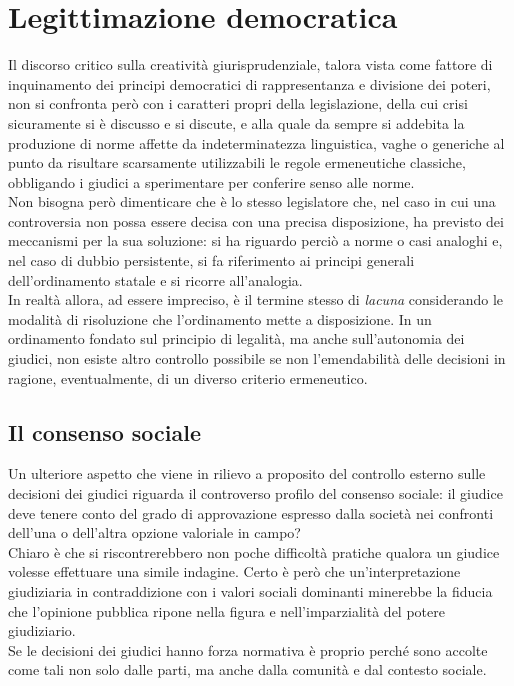 \section{Legittimazione democratica} 
Il discorso critico sulla creatività giurisprudenziale, talora vista come fattore di inquinamento dei principi democratici di rappresentanza e divisione dei poteri, non si confronta però con i caratteri propri della legislazione, della cui crisi sicuramente si è discusso e si discute, e alla quale da sempre si addebita la produzione di norme affette da indeterminatezza linguistica, vaghe o generiche al punto da risultare scarsamente utilizzabili le regole ermeneutiche classiche, obbligando i giudici a sperimentare per conferire senso alle norme.
\\ Non bisogna però dimenticare che è lo stesso legislatore che, nel caso in cui una controversia non possa essere decisa con una precisa disposizione, ha previsto dei meccanismi per la sua soluzione: si ha riguardo perciò a norme o casi analoghi e, nel caso di dubbio persistente, si fa riferimento ai principi generali dell'ordinamento statale e si ricorre all'analogia.
\\In realtà allora, ad essere impreciso, è il termine stesso di \textit{lacuna} considerando le modalità di risoluzione che l'ordinamento mette a disposizione.
In un ordinamento fondato sul principio di legalità, ma anche sull'autonomia dei giudici, non esiste altro controllo possibile se non l'emendabilità delle decisioni in ragione, eventualmente, di un diverso criterio ermeneutico.

\subsection{Il consenso sociale}
Un ulteriore aspetto che viene in rilievo a proposito del controllo esterno sulle decisioni dei giudici riguarda il controverso profilo del consenso sociale: il giudice deve tenere conto del grado di approvazione espresso dalla società nei confronti dell'una o dell'altra opzione valoriale in campo?
\\Chiaro è che si riscontrerebbero non poche difficoltà pratiche qualora un giudice volesse effettuare una simile indagine.
Certo è però che un'interpretazione giudiziaria in contraddizione con i valori sociali dominanti minerebbe la fiducia che l'opinione pubblica ripone nella figura e nell'imparzialità del potere giudiziario.
\\Se le decisioni dei giudici hanno forza normativa è proprio perché sono accolte come tali non solo dalle parti, ma anche dalla comunità e dal contesto sociale.

